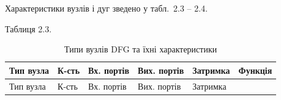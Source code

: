 \documentclass[
]{article}
\begin{document}
Характеристики вузлів і дуг зведено у табл.~2.3 -- 2.4.

Таблиця 2.3.

\begin{longtable}[]{@{}
  >{\raggedright\arraybackslash}p{}
  >{\raggedright\arraybackslash}p{}
  >{\raggedright\arraybackslash}p{}
  >{\raggedright\arraybackslash}p{}
  >{\raggedright\arraybackslash}p{}
  >{\raggedright\arraybackslash}p{}@{}}
\caption{Типи вузлів DFG та їхні характеристики}\tabularnewline
\toprule\noalign{}
\begin{minipage}[b]{\linewidth}\raggedright
Тип вузла
\end{minipage} & \begin{minipage}[b]{\linewidth}\raggedright
К-сть
\end{minipage} & \begin{minipage}[b]{\linewidth}\raggedright
Вх. портів
\end{minipage} & \begin{minipage}[b]{\linewidth}\raggedright
Вих. портів
\end{minipage} & \begin{minipage}[b]{\linewidth}\raggedright
Затримка
\end{minipage} & \begin{minipage}[b]{\linewidth}\raggedright
Функція
\end{minipage} \\
\midrule\noalign{}
\endfirsthead
\toprule\noalign{}
\begin{minipage}[b]{\linewidth}\raggedright
Тип вузла
\end{minipage} & \begin{minipage}[b]{\linewidth}\raggedright
К-сть
\end{minipage} & \begin{minipage}[b]{\linewidth}\raggedright
Вх. портів
\end{minipage} & \begin{minipage}[b]{\linewidth}\raggedright
Вих. портів
\end{minipage} & \begin{minipage}[b]{\linewidth}\raggedright
Затримка
\end{minipage} & \begin{minipage}[b]{\linewidth}\raggedright

\end{minipage}
\end{longtable}
\end{document}

